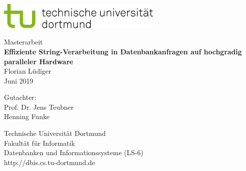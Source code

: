 \begin{titlepage}
	\vspace*{-2cm}
	\newlength{\links}
	\setlength{\links}{-1.5cm}
	\sffamily
	\hspace*{\links}
	
	\begin{minipage}{12.5cm}
		\includegraphics[width=8cm]{bilder/tud_logo_rgb}
	\end{minipage}
	
	\vspace*{4cm}
	
	\hspace*{\links}
	\hspace*{-0.2cm}
	\begin{minipage}{9cm}
		\large
		\begin{center}
			{\Large Masterarbeit} \\
			\vspace*{1cm}
			\textbf{Effiziente String-Verarbeitung in Datenbankanfragen auf hochgradig paralleler Hardware} \\
			\vspace*{1cm}
			Florian Lüdiger\\
			Juni 2019
		\end{center}
	\end{minipage}
	\normalsize
	\vspace*{4.5cm}
	
	
	\vspace*{2.1cm}
	
	\hspace*{\links}
	\begin{minipage}[b]{5cm}
		\raggedright
		Gutachter: \\
		Prof. Dr. Jens Teubner \\
		Henning Funke \\
	\end{minipage}
	
	\vspace*{2.5cm}
	\hspace*{\links}
	\begin{minipage}[b]{8cm}
		\raggedright
		Technische Universität Dortmund \\
		Fakultät für Informatik\\
		Datenbanken und Informationssysteme (LS-6)\\
		http://dbis.cs.tu-dortmund.de
	\end{minipage}
	
\end{titlepage}
